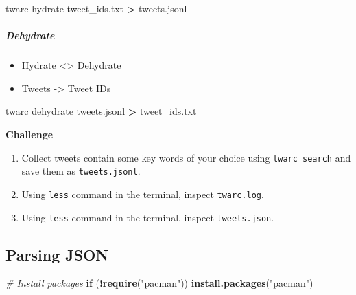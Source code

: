 \documentclass[
]{book}
\newenvironment{Shaded}{\begin{snugshade}}{\end{snugshade}}
\newcommand{\CommentTok}[1]{\textcolor[rgb]{0.56,0.35,0.01}{\textit{#1}}}
\newcommand{\ControlFlowTok}[1]{\textcolor[rgb]{0.13,0.29,0.53}{\textbf{#1}}}
\newcommand{\ExtensionTok}[1]{#1}
\newcommand{\KeywordTok}[1]{\textcolor[rgb]{0.13,0.29,0.53}{\textbf{#1}}}
\newcommand{\NormalTok}[1]{#1}
\newcommand{\OperatorTok}[1]{\textcolor[rgb]{0.81,0.36,0.00}{\textbf{#1}}}
\newcommand{\StringTok}[1]{\textcolor[rgb]{0.31,0.60,0.02}{#1}}
\providecommand{\tightlist}{%
  \setlength{\itemsep}{0pt}\setlength{\parskip}{0pt}}
\begin{document}
\begin{Shaded}
\begin{Highlighting}[]
\ExtensionTok{twarc}\NormalTok{ hydrate tweet\_ids.txt }\OperatorTok{\textgreater{}}\NormalTok{ tweets.jsonl }
\end{Highlighting}
\end{Shaded}

\hypertarget{dehydrate}{%
\subparagraph{Dehydrate}\label{dehydrate}}

\begin{itemize}
\tightlist
\item
  Hydrate \textless\textgreater{} Dehydrate
\item
  Tweets -\textgreater{} Tweet IDs
\end{itemize}

\begin{Shaded}
\begin{Highlighting}[]
\ExtensionTok{twarc}\NormalTok{ dehydrate tweets.jsonl }\OperatorTok{\textgreater{}}\NormalTok{ tweet\_ids.txt}
\end{Highlighting}
\end{Shaded}

\textbf{Challenge}

\begin{enumerate}
\def\labelenumi{\arabic{enumi}.}
\item
  Collect tweets contain some key words of your choice using \texttt{twarc\ search} and save them as \texttt{tweets.jsonl}.
\item
  Using \texttt{less} command in the terminal, inspect \texttt{twarc.log}.
\item
  Using \texttt{less} command in the terminal, inspect \texttt{tweets.json}.
\end{enumerate}

\hypertarget{parsing-json}{%
\subsection{Parsing JSON}\label{parsing-json}}

\begin{Shaded}
\begin{Highlighting}[]
\CommentTok{\# Install packages }
\ControlFlowTok{if}\NormalTok{ (}\OperatorTok{!}\KeywordTok{require}\NormalTok{(}\StringTok{"pacman"}\NormalTok{)) }\KeywordTok{install.packages}\NormalTok{(}\StringTok{"pacman"}\NormalTok{)}
\end{Highlighting}
\end{Shaded}
\end{document}
